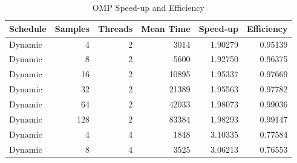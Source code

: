 \documentclass[journal,transmag]{IEEEtran}
\begin{document}
\section{}
	\begin{table}[h]
		
		
		
		
		
		
		
		
	\centering
	\caption{OMP Speed-up and Efficiency}
	\label{table_omp_data}
	\begin{tabular}{|l|r|r|r|r|r|}
		\hline
		Schedule & \multicolumn{1}{l|}{Samples} & \multicolumn{1}{l|}{Threads} & \multicolumn{1}{l|}{Mean Time} & \multicolumn{1}{l|}{Speed-up} & \multicolumn{1}{l|}{Efficiency} \\ \hline
		Dynamic       & 4                            & 2                            & 3014                              & 1.90279                       & 0.95139                         \\ \hline
		Dynamic       & 8                            & 2                            & 5600                              & 1.92750                       & 0.96375                         \\ \hline
		Dynamic       & 16                           & 2                            & 10895                             & 1.95337                       & 0.97669                         \\ \hline
		Dynamic       & 32                           & 2                            & 21389                             & 1.95563                       & 0.97782                         \\ \hline
		Dynamic       & 64                           & 2                            & 42033                             & 1.98073                       & 0.99036                         \\ \hline
		Dynamic       & 128                          & 2                            & 83384                             & 1.98293                       & 0.99147                         \\ \hline
		Dynamic       & 4                            & 4                            & 1848                              & 3.10335                       & 0.77584                         \\ \hline
		Dynamic       & 8                            & 4                            & 3525                              & 3.06213                       & 0.76553                         \\ \hline

\end{tabular}
\end{table}
\end{document}
